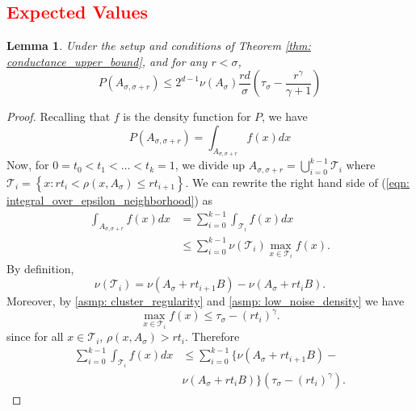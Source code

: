 \documentclass{article}
\newcommand{\set}[1]{\left\{#1\right\}}
\newcommand{\Asig}{A_{\sigma}}
\newcommand{\1}{\mathbf{1}}
\theoremstyle{aldenthm}
\newtheorem{lemma}{Lemma}
\begin{document}
\subsection{\textcolor{red}{Expected Values}}
\begin{lemma}
	\label{lem: expected_number_boundary_points}
	Under the setup and conditions of Theorem \ref{thm: conductance_upper_bound}, and for any $r < \sigma$,
	\begin{equation*}
	P(A_{\sigma, \sigma + r}) \leq 2^{d-1} \nu(\Asig) \frac{rd}{\sigma}  \left(\tau_{\sigma} - \frac{r^{\gamma}}{\gamma + 1}\right)
	\end{equation*}	
\end{lemma}
\begin{proof}
	Recalling that $f$ is the density function for $P$, we have
	\begin{equation}
	\label{eqn: integral_over_epsilon_neighborhood}
	P(A_{\sigma, \sigma + r}) = \int_{A_{\sigma, \sigma + r}} f(x) dx
	\end{equation}
	Now, for $0 = t_0 < t_1 < \ldots < t_k = 1$, we divide up $A_{\sigma, \sigma + r} = \bigcup_{i = 0}^{k-1} \mathcal{T}_i$ where $\mathcal{T}_i = \set{x: rt_i < \rho(x, \Asig) \leq rt_{i+1}}$. We can rewrite the right hand side of (\ref{eqn: integral_over_epsilon_neighborhood}) as
	\begin{align*}
	\int_{A_{\sigma, \sigma + r}} f(x) dx & = \sum_{i = 0}^{k-1} \int_{\mathcal{T}_i} f(x) dx \\
	& \leq \sum_{i = 0}^{k-1} \nu(\mathcal{T}_i) \max_{x \in \mathcal{T}_i} f(x).
	\end{align*}
	By definition, 
	\begin{equation*}
	\nu(\mathcal{T}_i) = \nu(\Asig + rt_{i+1}B) - \nu(\Asig + rt_{i}B).
	\end{equation*}
	 Moreover, by \ref{asmp: cluster_regularity} and \ref{asmp: low_noise_density} we have
	 \begin{equation*}
	 \max_{x \in \mathcal{T}_i} f(x) \leq \tau_{\sigma} - (rt_i)^{\gamma}.
	 \end{equation*}
	 since for all $x \in \mathcal{T}_i$, $\rho(x, \Asig) > rt_i$.
	 Therefore
	\begin{align}
	\label{eqn: telescoping_sum}
	\sum_{i = 0}^{k-1} \int_{\mathcal{T}_i} f(x) dx & \leq \nonumber \sum_{i = 0}^{k-1} \biggl\{\nu(\Asig + rt_{i+1}B) - \\
	& \nu(\Asig + rt_{i}B)\biggr\} \left(\tau_{\sigma} - (rt_i)^{\gamma}\right).
	\end{align}
	

\end{proof}
\end{document}
